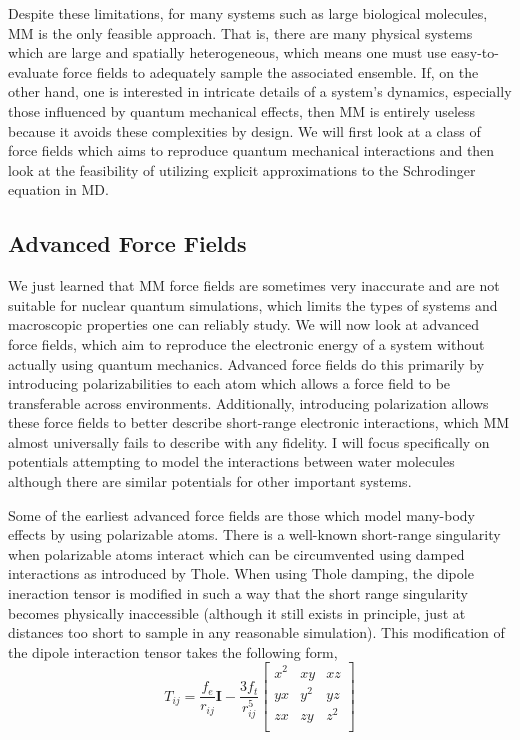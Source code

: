 \documentclass[11pt, proquest]{uwthesis}[2020/02/24]
\begin{document}
\par Despite these limitations, for many systems such as large biological molecules, MM is the only feasible approach. That is, there are many physical systems which are large and spatially heterogeneous, which means one must use easy-to-evaluate force fields to adequately sample the associated ensemble. If, on the other hand, one is interested in intricate details of a system's dynamics, especially those influenced by quantum mechanical effects, then MM is entirely useless because it avoids these complexities by design. We will first look at a class of force fields which aims to reproduce quantum mechanical interactions and then look at the feasibility of utilizing explicit approximations to the Schrodinger equation in MD.
\subsection{Advanced Force Fields}
\par We just learned that MM force fields are sometimes very inaccurate and are not suitable for nuclear quantum simulations, which limits the types of systems and macroscopic properties one can reliably study. We will now look at advanced force fields, which aim to reproduce the electronic energy of a system without actually using quantum mechanics. Advanced force fields do this primarily by introducing polarizabilities to each atom which allows a force field to be transferable across environments. Additionally, introducing polarization allows these force fields to better describe short-range electronic interactions, which MM almost universally fails to describe with any fidelity. I will focus specifically on potentials attempting to model the interactions between water molecules although there are similar potentials for other important systems.

\par Some of the earliest advanced force fields are those which model many-body effects by using polarizable atoms. There is a well-known short-range singularity when polarizable atoms interact which can be circumvented using damped interactions as introduced by Thole\autocite{thole_molecular_1981}. When using Thole damping, the dipole ineraction tensor is modified in such a way that the short range singularity becomes physically inaccessible (although it still exists in principle, just at distances too short to sample in any reasonable simulation). This modification of the dipole interaction tensor takes the following form\autocite{thole_molecular_1981},
\begin{equation}
    T_{ij}=\frac{f_e}{r_{ij}}\mathbf{I}-\frac{3f_t}{r_{ij}^5}
    \begin{bmatrix}
    x^2 & xy & xz \\
    yx & y^2 & yz \\
    zx & zy & z^2 \\
    \end{bmatrix}
    \label{eq:thole_damping}
\end{equation}
\end{document}
